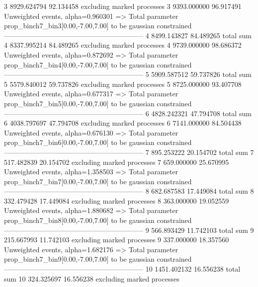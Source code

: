 3          8929.624794     92.134458       excluding marked processes    
3          9393.000000     96.917491       Unweighted events, alpha=0.960301
  => Total parameter prop_binch7_bin3[0.00,-7.00,7.00] to be gaussian constrained
------------------------------------------------------------
4          8499.143827     84.489265       total sum                     
4          8337.995214     84.489265       excluding marked processes    
4          9739.000000     98.686372       Unweighted events, alpha=0.872692
  => Total parameter prop_binch7_bin4[0.00,-7.00,7.00] to be gaussian constrained
------------------------------------------------------------
5          5909.587512     59.737826       total sum                     
5          5579.840012     59.737826       excluding marked processes    
5          8725.000000     93.407708       Unweighted events, alpha=0.677317
  => Total parameter prop_binch7_bin5[0.00,-7.00,7.00] to be gaussian constrained
------------------------------------------------------------
6          4828.242321     47.794708       total sum                     
6          4038.797697     47.794708       excluding marked processes    
6          7141.000000     84.504438       Unweighted events, alpha=0.676130
  => Total parameter prop_binch7_bin6[0.00,-7.00,7.00] to be gaussian constrained
------------------------------------------------------------
7          895.253222      20.154702       total sum                     
7          517.482839      20.154702       excluding marked processes    
7          659.000000      25.670995       Unweighted events, alpha=1.358503
  => Total parameter prop_binch7_bin7[0.00,-7.00,7.00] to be gaussian constrained
------------------------------------------------------------
8          682.687583      17.449084       total sum                     
8          332.479428      17.449084       excluding marked processes    
8          363.000000      19.052559       Unweighted events, alpha=1.880682
  => Total parameter prop_binch7_bin8[0.00,-7.00,7.00] to be gaussian constrained
------------------------------------------------------------
9          566.893429      11.742103       total sum                     
9          215.667993      11.742103       excluding marked processes    
9          337.000000      18.357560       Unweighted events, alpha=1.682176
  => Total parameter prop_binch7_bin9[0.00,-7.00,7.00] to be gaussian constrained
------------------------------------------------------------
10         1451.402132     16.556238       total sum                     
10         324.325697      16.556238       excluding marked processes    
